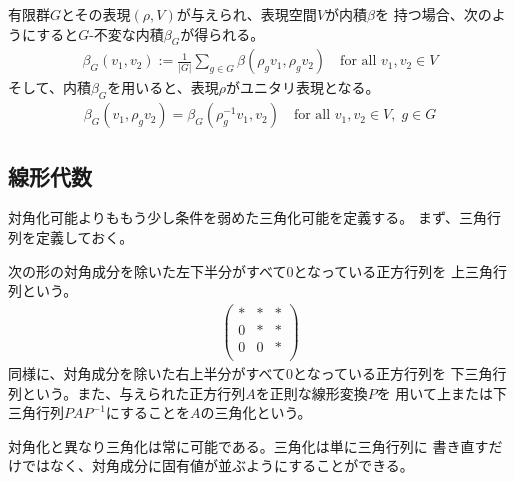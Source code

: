 {	\begin{todo}[ここまで]\label{todo:ここまで} %
		有限群$G$とその表現$(\rho,V)$が与えられ、表現空間$V$が内積$\beta$を
		持つ場合、次のようにすると$G$-不変な内積$\beta_G$が得られる。
		\begin{equation*}\begin{split}
			\beta_G(v_1, v_2) 
			:= \frac{1}{|G|}\sum_{g\in G} \beta(\rho_gv_1, \rho_gv_2)
			\quad\text{for all } v_1,v_2\in V
		\end{split}\end{equation*}
		そして、内積$\beta_G$を用いると、表現$\rho$がユニタリ表現となる。
		\begin{equation*}\begin{split}
			\beta_G(v_1, \rho_gv_2) = \beta_G(\rho_g^{-1}v_1, v_2)
			\quad\text{for all } v_1,v_2\in V,\; g\in G
		\end{split}\end{equation*}
	\end{todo} %
\subsection{線形代数}\label{s2:線形代数} %
	対角化可能よりももう少し条件を弱めた三角化可能を定義する。
	まず、三角行列を定義しておく。

	\begin{definition}[三角行列]\label{def:三角行列} %
		次の形の対角成分を除いた左下半分がすべて$0$となっている正方行列を
		上三角行列という。
		\begin{equation*}\begin{split}
			\begin{pmatrix}
				* & * & * \\
				0 & * & * \\
				0 & 0 & * \\
			\end{pmatrix}
		\end{split}\end{equation*}
		同様に、対角成分を除いた右上半分がすべて$0$となっている正方行列を
		下三角行列という。また、与えられた正方行列$A$を正則な線形変換$P$を
		用いて上または下三角行列$PAP^{-1}$にすることを$A$の三角化という。
	\end{definition} %

	対角化と異なり三角化は常に可能である。三角化は単に三角行列に
	書き直すだけではなく、対角成分に固有値が並ぶようにすることができる。

}
